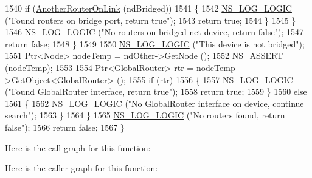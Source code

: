 \begin{DoxyCode}
1540               \textcolor{keywordflow}{if} (\hyperlink{classns3_1_1GlobalRouter_ae2af74f394b3b8de4daad7000fb0b9f7}{AnotherRouterOnLink} (ndBridged))
1541                 \{
1542                   \hyperlink{group__logging_ga88acd260151caf2db9c0fc84997f45ce}{NS\_LOG\_LOGIC} (\textcolor{stringliteral}{"Found routers on bridge port, return true"});
1543                   \textcolor{keywordflow}{return} \textcolor{keyword}{true};
1544                 \}
1545             \}
1546           \hyperlink{group__logging_ga88acd260151caf2db9c0fc84997f45ce}{NS\_LOG\_LOGIC} (\textcolor{stringliteral}{"No routers on bridged net device, return false"});
1547           \textcolor{keywordflow}{return} \textcolor{keyword}{false};
1548         \}
1549 
1550       \hyperlink{group__logging_ga88acd260151caf2db9c0fc84997f45ce}{NS\_LOG\_LOGIC} (\textcolor{stringliteral}{"This device is not bridged"});
1551       Ptr<Node> nodeTemp = ndOther->GetNode ();
1552       \hyperlink{assert_8h_a6dccdb0de9b252f60088ce281c49d052}{NS\_ASSERT} (nodeTemp);
1553 
1554       Ptr<GlobalRouter> rtr = nodeTemp->GetObject<\hyperlink{classns3_1_1GlobalRouter_a778050c70fe491c0fe62b7cf6b10aaf6}{GlobalRouter}> ();
1555       \textcolor{keywordflow}{if} (rtr)
1556         \{
1557           \hyperlink{group__logging_ga88acd260151caf2db9c0fc84997f45ce}{NS\_LOG\_LOGIC} (\textcolor{stringliteral}{"Found GlobalRouter interface, return true"});
1558           \textcolor{keywordflow}{return} \textcolor{keyword}{true};
1559         \}
1560       \textcolor{keywordflow}{else} 
1561         \{
1562           \hyperlink{group__logging_ga88acd260151caf2db9c0fc84997f45ce}{NS\_LOG\_LOGIC} (\textcolor{stringliteral}{"No GlobalRouter interface on device, continue search"});
1563         \}
1564     \}
1565   \hyperlink{group__logging_ga88acd260151caf2db9c0fc84997f45ce}{NS\_LOG\_LOGIC} (\textcolor{stringliteral}{"No routers found, return false"});
1566   \textcolor{keywordflow}{return} \textcolor{keyword}{false};
1567 \}
\end{DoxyCode}


Here is the call graph for this function\+:




Here is the caller graph for this function\+:


